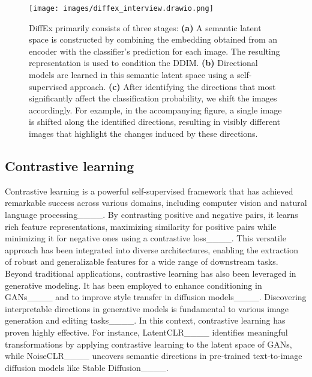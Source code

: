 \begin{figure*}[ht]
  \centering
  \texttt{[image: images/diffex\_interview.drawio.png]} %
  \caption{DiffEx primarily consists of three stages: \textbf{(a)} A semantic latent space is constructed by combining the embedding obtained from an encoder with the classifier's prediction for each image. The resulting representation is used to condition the DDIM. \textbf{(b)} Directional models are learned in this semantic latent space using a self-supervised approach. \textbf{(c)} After identifying the directions that most significantly affect the classification probability, we shift the images accordingly. For example, in the accompanying figure, a single image is shifted along the identified directions, resulting in visibly different images that highlight the changes induced by these directions.}
  \label{fig:main_figure}
\end{figure*}

\subsection{Contrastive learning}

Contrastive learning is a powerful self-supervised framework that has achieved remarkable success across various domains, including computer vision and natural language processing____. By contrasting positive and negative pairs, it learns rich feature representations, maximizing similarity for positive pairs while minimizing it for negative ones using a contrastive loss____. This versatile approach has been integrated into diverse architectures, enabling the extraction of robust and generalizable features for a wide range of downstream tasks. Beyond traditional applications, contrastive learning has also been leveraged in generative modeling. It has been employed to enhance conditioning in GANs____ and to improve style transfer in diffusion models____. Discovering interpretable directions in generative models is fundamental to various image generation and editing tasks____. In this context, contrastive learning has proven highly effective. For instance, LatentCLR____ identifies meaningful transformations by applying contrastive learning to the latent space of GANs, while NoiseCLR____ uncovers semantic directions in pre-trained text-to-image diffusion models like Stable Diffusion____.